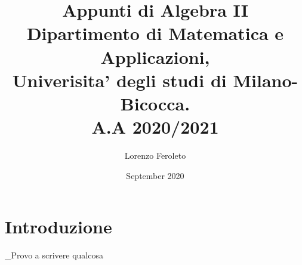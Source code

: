 \documentclass{article}
\title{
  \Large{\bf{Appunti di Algebra II}} \\
  Dipartimento di Matematica e Applicazioni,\\
  Univerisita' degli studi di Milano-Bicocca. \\
  A.A 2020/2021
}
\author{Lorenzo Feroleto}
\date{September 2020}
\begin{document}
\maketitle
\newpage

\section{Introduzione}
\begin{theo}
_Provo a scrivere qualcosa
\end{theo}
\end{document}
